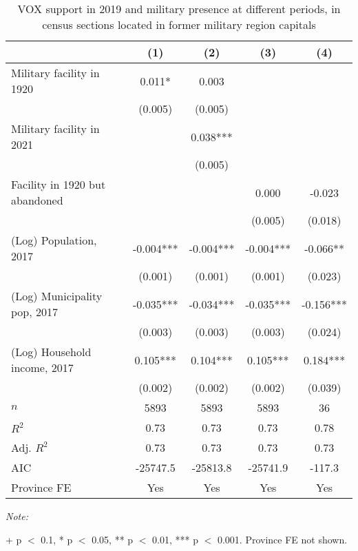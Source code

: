\begin{table}[!h]

\caption{VOX support in 2019 and military presence at different periods, in census sections located in former military region capitals\label{tab:lm\_vox\_c1920\_HQ}}
\centering
\begin{threeparttable}
\begin{tabular}[t]{lcccc}
\toprule
  & (1) & (2) & (3) & (4)\\
\midrule
Military facility in 1920 & 0.011* & 0.003 &  & \\
 & (0.005) & (0.005) &  & \\
Military facility in 2021 &  & 0.038*** &  & \\
 &  & (0.005) &  & \\
Facility in 1920 but abandoned &  &  & 0.000 & -0.023\\
 &  &  & (0.005) & (0.018)\\
(Log) Population, 2017 & -0.004*** & -0.004*** & -0.004*** & -0.066**\\
 & (0.001) & (0.001) & (0.001) & (0.023)\\
(Log) Municipality pop, 2017 & -0.035*** & -0.034*** & -0.035*** & -0.156***\\
 & (0.003) & (0.003) & (0.003) & (0.024)\\
(Log) Household income, 2017 & 0.105*** & 0.104*** & 0.105*** & 0.184***\\
 & (0.002) & (0.002) & (0.002) & (0.039)\\
\midrule
$n$ & 5893 & 5893 & 5893 & 36\\
$R^2$ & 0.73 & 0.73 & 0.73 & 0.78\\
Adj. $R^2$ & 0.73 & 0.73 & 0.73 & 0.73\\
AIC & -25747.5 & -25813.8 & -25741.9 & -117.3\\
Province FE & Yes & Yes & Yes & Yes\\
\bottomrule
\end{tabular}
\begin{tablenotes}[para]
\item \textit{Note: } 
\item + p $<$ 0.1, * p $<$ 0.05, ** p $<$ 0.01, *** p $<$ 0.001. Province FE not shown.
\end{tablenotes}
\end{threeparttable}
\end{table}
